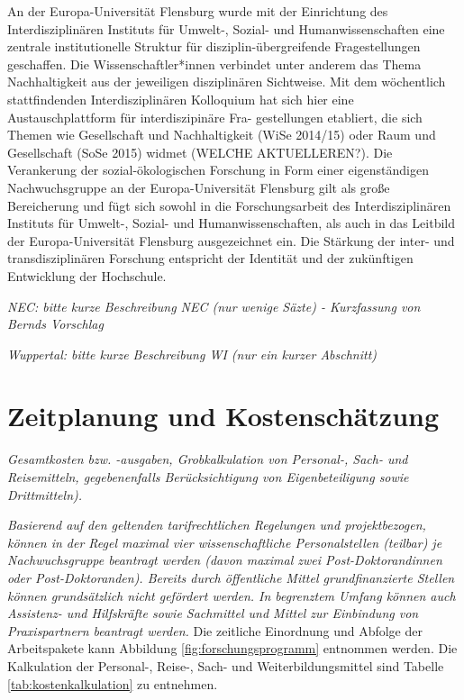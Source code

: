 \documentclass[a4paper,11pt,twoside]{scrartcl}
\begin{document}
An der Europa-Universität Flensburg wurde mit der Einrichtung des Interdisziplinären Instituts für Umwelt-, Sozial- und Humanwissenschaften eine zentrale institutionelle Struktur für disziplin-übergreifende Fragestellungen geschaffen. Die Wissenschaftler*innen verbindet unter anderem das Thema Nachhaltigkeit aus der jeweiligen disziplinären Sichtweise. Mit dem wöchentlich stattfindenden Interdisziplinären Kolloquium hat sich hier eine Austauschplattform für interdiszipinäre Fra-
gestellungen etabliert, die sich Themen wie Gesellschaft und Nachhaltigkeit (WiSe 2014/15) oder Raum und Gesellschaft (SoSe 2015) widmet (WELCHE AKTUELLEREN?). Die Verankerung der sozial-ökologischen Forschung in Form einer eigenständigen Nachwuchsgruppe an der Europa-Universität Flensburg gilt als große Bereicherung und fügt sich sowohl in die Forschungsarbeit des Interdisziplinären Instituts für Umwelt-, Sozial- und Humanwissenschaften, als auch in das Leitbild der Europa-Universität Flensburg ausgezeichnet ein. Die Stärkung der inter- und transdisziplinären Forschung entspricht der Identität und der zukünftigen Entwicklung der Hochschule.

\textit{NEC: bitte kurze Beschreibung NEC (nur wenige Säzte) - Kurzfassung von Bernds Vorschlag}

\textit{Wuppertal: bitte kurze Beschreibung WI (nur ein kurzer Abschnitt)}


\section{Zeitplanung und Kostenschätzung}
\textit{Gesamtkosten bzw. -ausgaben, Grobkalkulation von Personal-, Sach- und Reisemitteln, gegebenenfalls Berücksichtigung von Eigenbeteiligung sowie Drittmitteln).}

\textit{Basierend auf den geltenden tarifrechtlichen Regelungen und projektbezogen, können in der Regel maximal vier wissenschaftliche Personalstellen (teilbar) je Nachwuchsgruppe beantragt werden (davon maximal zwei Post-Doktorandinnen oder Post-Doktoranden). Bereits durch öffentliche Mittel grundfinanzierte Stellen können grundsätzlich nicht gefördert werden.
In begrenztem Umfang können auch Assistenz- und Hilfskräfte sowie Sachmittel und Mittel zur Einbindung von Praxispartnern beantragt werden.}
Die zeitliche Einordnung und Abfolge der Arbeitspakete kann Abbildung \ref{fig:forschungsprogramm} entnommen werden. Die Kalkulation der Personal-, Reise-, Sach- und Weiterbildungsmittel sind Tabelle \ref{tab:kostenkalkulation} zu entnehmen.
\end{document}

